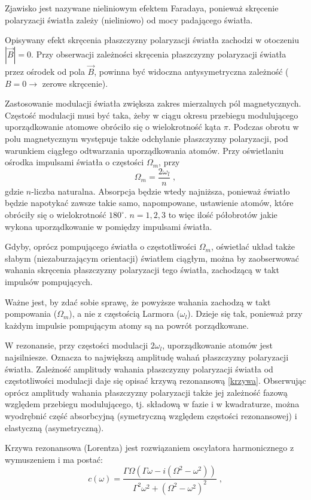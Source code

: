 \documentclass[a4paper,10pt]{article}
\begin{document}
Zjawisko jest nazywane nieliniowym efektem Faradaya, ponieważ skręcenie polaryzacji światła zależy (nieliniowo) od mocy padającego światła.

Opisywany efekt skręcenia płaszczyzny polaryzacji światła zachodzi w otoczeniu $|\vec B|=0$. Przy obserwacji zależności skręcenia płaszczyzny polaryzacji światła przez ośrodek od pola $\vec B$, powinna być widoczna antysymetryczna zależność ($B=0\rightarrow$ zerowe skręcenie).

 Zastosowanie modulacji światła zwiększa zakres mierzalnych pól magnetycznych. Częstość modulacji musi być taka, żeby w ciągu okresu przebiegu modulującego uporządkowanie atomowe obróciło się o wielokrotność kąta $\pi$. 
Podczas obrotu w polu magnetycznym występuje także odchylanie płaszczyzny polaryzacji, pod warunkiem ciągłego odtwarzania uporządkowania atomów. Przy oświetlaniu ośrodka impulsami światła o częstości $\Omega_m$, przy
\begin{equation}
\Omega_m=\frac{2 \omega_l}{n} \; ,
\end{equation}
gdzie $n$-liczba naturalna. Absorpcja będzie wtedy najniższa, ponieważ światło będzie napotykać zawsze takie samo, napompowane, ustawienie atomów, które obróciły się o wielokrotność $180^{\circ}$.  $n=1,2,3$ to więc ilość półobrotów jakie wykona uporządkowanie w pomiędzy impulsami światła.

Gdyby, oprócz pompującego światła o częstotliwości $\Omega_m$, oświetlać układ także słabym (niezaburzającym orientacji) światłem ciągłym, można by zaobserwować wahania skręcenia płaszczyzny polaryzacji tego światła, zachodzącą w takt impulsów pompujących.

Ważne jest, by zdać sobie sprawę, że powyższe wahania zachodzą w takt pompowania ($\Omega_m$), a nie z częstością Larmora ($\omega_l$). Dzieje się tak, ponieważ przy każdym impulsie pompującym atomy są na powrót porządkowane.

W rezonansie, przy częstości modulacji $2 \omega_l$, uporządkowanie atomów jest najsilniesze. Oznacza to największą amplitudę wahań płaszczyzny polaryzacji światła. Zależność amplitudy wahania płaszczyzny polaryzacji światła
od częstotliwości modulacji daje się opisać krzywą rezonansową \ref{krzywa}. Obserwując oprócz amplitudy wahania płaszczyzny polaryzacji także jej zależność fazową względem przebiegu modulującego, tj. składową w fazie i w kwadraturze, można wyodrębnić część absorbcyjną (symetryczną względem częstości rezonansowej) i elastyczną (asymetryczną).

Krzywa rezonansowa (Lorentza) jest rozwiązaniem oscylatora harmonicznego z wymuszeniem i ma postać:
\begin{equation}
c(\omega)=\frac{\Gamma  \Omega  \left(\Gamma  \omega -i \left(\Omega ^2-\omega ^2\right)\right)}{\Gamma ^2 \omega ^2+\left(\Omega ^2-\omega ^2\right)^2} \; ,
\label{krzywa}
\end{equation}
\end{document}
